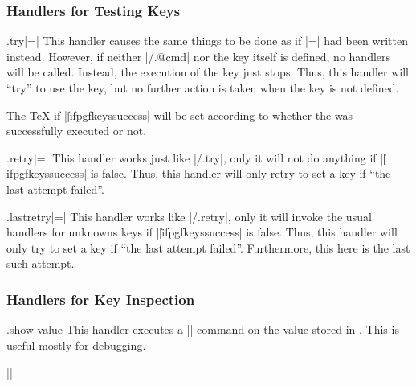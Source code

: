 \subsubsection{Handlers for Testing Keys}

\begin{handler}{{.try}|=|}
  This handler causes the same things to be done as if
  |=| had been written instead. However, if
  neither |/.@cmd| nor the key itself is defined, no
  handlers will be called. Instead,
  the execution of the key just stops. Thus, this handler will ``try''
  to use the key, but no further action is taken when the key is not
  defined.

  The \TeX-if |\||ifpgfkeyssuccess| will be set according to whether
  the  was successfully executed or not.
\begin{codeexample}[]
\end{codeexample}
\end{handler}

\begin{handler}{{.retry}|=|}
  This handler works just like |/.try|, only it will not do anything if
  |\||ifpgfkeyssuccess| is false. Thus, this handler will only retry
  to set a key if ``the last attempt failed''.
\begin{codeexample}[]
\end{codeexample}
\end{handler}

\begin{handler}{{.lastretry}|=|}
	This handler works like |/.retry|, only it will invoke the usual handlers for unknowns keys if |\||ifpgfkeyssuccess| is false. Thus, this handler will only try to set a key if ``the last attempt failed''. Furthermore, this here is the last such attempt.
\end{handler}


\subsubsection{Handlers for Key Inspection}

\begin{handler}{{.show value}}
  This handler executes a |\show| command on the value stored in
  . This is useful mostly for debugging.

  \example ||
\end{handler}

